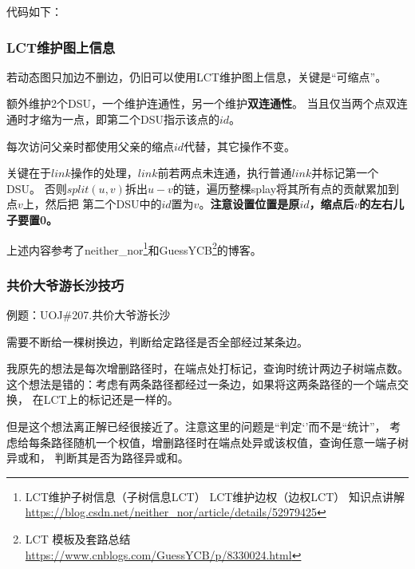 代码如下：


\subsubsection{LCT维护图上信息}
若动态图只加边不删边，仍旧可以使用LCT维护图上信息，关键是``可缩点''。

额外维护2个DSU，一个维护连通性，另一个维护{\bfseries 双连通性}。
当且仅当两个点双连通时才缩为一点，即第二个DSU指示该点的$id$。

每次访问父亲时都使用父亲的缩点$id$代替，其它操作不变。

关键在于$link$操作的处理，$link$前若两点未连通，执行普通$link$并标记第一个DSU。
否则$split(u,v)$拆出$u-v$的链，遍历整棵splay将其所有点的贡献累加到点$v$上，然后把
第二个DSU中的$id$置为$v$。{\bfseries 注意设置位置是原$id$，缩点后$v$的左右儿子要置0。}

上述内容参考了neither\_nor\footnote{
    LCT维护子树信息（子树信息LCT） LCT维护边权（边权LCT） 知识点讲解
    \url{https://blog.csdn.net/neither\_nor/article/details/52979425}
}和GuessYCB\footnote{
    LCT 模板及套路总结
    \url{https://www.cnblogs.com/GuessYCB/p/8330024.html}
}的博客。

\subsubsection{共价大爷游长沙技巧}
例题：UOJ\#207.共价大爷游长沙

需要不断给一棵树换边，判断给定路径是否全部经过某条边。

我原先的想法是每次增删路径时，在端点处打标记，查询时统计两边子树端点数。
这个想法是错的：考虑有两条路径都经过一条边，如果将这两条路径的一个端点交换，
在LCT上的标记还是一样的。

但是这个想法离正解已经很接近了。注意这里的问题是``判定‘'而不是``统计''，
考虑给每条路径随机一个权值，增删路径时在端点处异或该权值，查询任意一端子树异或和，
判断其是否为路径异或和。
